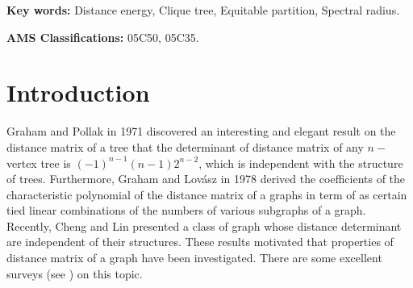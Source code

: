 \documentclass[10pt]{article}
\begin{document}

\maketitle

\begin{abstract}  The distance energy of a simple connected graph $G$ is  defined as the sum of absolute values of its  distance eigenvalues. In this paper, we mainly give a positive answer to a conjecture of distance energy of clique trees proposed by Lin, Liu and Lu [H.~Q.~ Lin, R.~F.~Liu, X.~W.~Lu, The inertia and energy of the distance matrix of a connected graph, {\it Linear Algebra Appl.,} 467 (2015), 29-39.].
\end{abstract}

{{\bf Key words:}
Distance energy,  Clique tree, Equitable partition, Spectral radius.}

{{\bf AMS Classifications:} 05C50, 05C35}.

\section{Introduction}


  Graham and Pollak  \cite{graham1971} in 1971 discovered an interesting and elegant result on the distance matrix of a tree that  the determinant of distance matrix of  any $n-$vertex tree   is $(-1)^{n-1}(n-1)2^{n-2}$, which is independent with the structure of  trees. Furthermore, Graham  and Lov\'{a}sz in 1978 \cite{graham1978}  derived  the coefficients of the characteristic polynomial of the distance matrix of a graphs  in term of  as certain tied linear combinations of the numbers of various subgraphs of a graph.  Recently,  Cheng and Lin \cite{cheng2018} presented a class of graph whose distance determinant  are independent of their structures.
    These results motivated that properties of distance matrix of a graph have been investigated.  There are some   excellent surveys  (see \cite{aouchiche2014, bapat2014, stevanovic2012}) on this topic.
\end{document}
